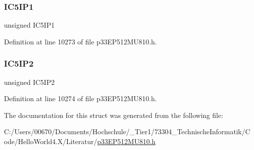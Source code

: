 \subsubsection{\texorpdfstring{I\+C5\+I\+P1}{IC5IP1}}
{\footnotesize\ttfamily unsigned I\+C5\+I\+P1}



Definition at line 10273 of file p33\+E\+P512\+M\+U810.\+h.

\mbox{\label{structtag_i_p_c9_b_i_t_s_a06e62bdb23c0c2f96ae41aa18c076fec}} 
\subsubsection{\texorpdfstring{I\+C5\+I\+P2}{IC5IP2}}
{\footnotesize\ttfamily unsigned I\+C5\+I\+P2}



Definition at line 10274 of file p33\+E\+P512\+M\+U810.\+h.



The documentation for this struct was generated from the following file\+:\begin{DoxyCompactItemize}
\item 
C\+:/\+Users/00670/\+Documents/\+Hochschule/\+\_\+\+Tier1/73304\+\_\+\+Technische\+Informatik/\+Code/\+Hello\+World4.\+X/\+Literatur/\hyperlink{p33_e_p512_m_u810_8h}{p33\+E\+P512\+M\+U810.\+h}\end{DoxyCompactItemize}
